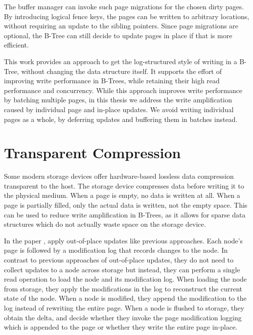 The buffer manager can invoke such page migrations for the chosen dirty pages.
By introducing logical fence keys, the pages can be written to arbitrary locations, without requiring an update to the sibling pointers.
Since page migrations are optional, the B-Tree can still decide to update pages in place if that is more efficient.

This work provides an approach to get the log-structured style of writing in a B-Tree, without changing the data structure itself.
It supports the effort of improving write performance in B-Trees, while retaining their high read performance and concurrency.
While this approach improves write performance by batching multiple pages, in this thesis we address the write amplification caused by individual page and in-place updates.
We avoid writing individual pages as a whole, by deferring updates and buffering them in batches instead.

\section{Transparent Compression}
Some modern storage devices offer hardware-based lossless data compression transparent to the host.
The storage device compresses data before writing it to the physical medium.
When a page is empty, no data is written at all.
When a page is partially filled, only the actual data is written, not the empty space.
This can be used to reduce write amplification in B-Trees, as it allows for sparse data structures which do not actually waste space on the storage device.

In the paper \cite{qiao2022compression}, apply out-of-place updates like previous approaches.
Each node's page is followed by a modification log that records changes to the node.
In contrast to previous approaches of out-of-place updates, they do not need to collect updates to a node across storage but instead, they can perform a single read operation to load the node and its modification log.
When loading the node from storage, they apply the modifications in the log to reconstruct the current state of the node.
When a node is modified, they append the modification to the log instead of rewriting the entire page.
When a node is flushed to storage, they obtain the delta, and decide whether they invoke the page modification logging which is appended to the page or whether they write the entire page in-place.

